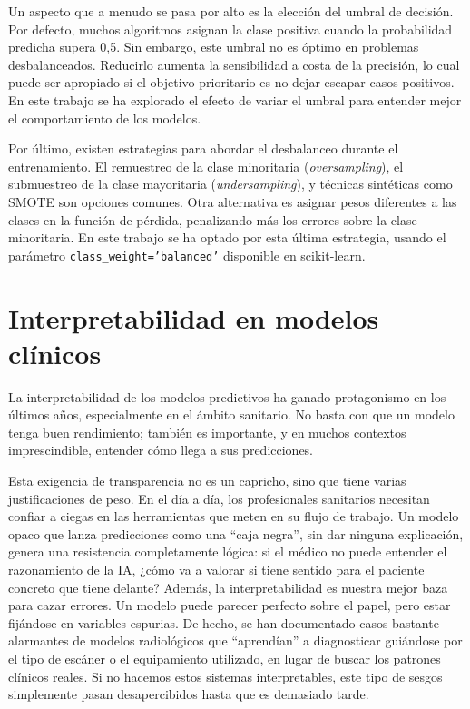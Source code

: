 \documentclass[12pt, a4paper, oneside]{report}
\begin{document}
Un aspecto que a menudo se pasa por alto es la elección del umbral de decisión. Por defecto, muchos algoritmos asignan la clase positiva cuando la probabilidad predicha supera 0,5. Sin embargo, este umbral no es óptimo en problemas desbalanceados. Reducirlo aumenta la sensibilidad a costa de la precisión, lo cual puede ser apropiado si el objetivo prioritario es no dejar escapar casos positivos. En este trabajo se ha explorado el efecto de variar el umbral para entender mejor el comportamiento de los modelos.

Por último, existen estrategias para abordar el desbalanceo durante el entrenamiento. El remuestreo de la clase minoritaria (\textit{oversampling}), el submuestreo de la clase mayoritaria (\textit{undersampling}), y técnicas sintéticas como SMOTE son opciones comunes. Otra alternativa es asignar pesos diferentes a las clases en la función de pérdida, penalizando más los errores sobre la clase minoritaria. En este trabajo se ha optado por esta última estrategia, usando el parámetro \texttt{class\_weight='balanced'} disponible en scikit-learn.

\section{Interpretabilidad en modelos clínicos}

La interpretabilidad de los modelos predictivos ha ganado protagonismo en los últimos años, especialmente en el ámbito sanitario. No basta con que un modelo tenga buen rendimiento; también es importante, y en muchos contextos imprescindible, entender cómo llega a sus predicciones.

Esta exigencia de transparencia no es un capricho, sino que tiene varias justificaciones de peso. En el día a día, los profesionales sanitarios necesitan confiar a ciegas en las herramientas que meten en su flujo de trabajo. Un modelo opaco que lanza predicciones como una ``caja negra'', sin dar ninguna explicación, genera una resistencia completamente lógica: si el médico no puede entender el razonamiento de la IA, ¿cómo va a valorar si tiene sentido para el paciente concreto que tiene delante? Además, la interpretabilidad es nuestra mejor baza para cazar errores. Un modelo puede parecer perfecto sobre el papel, pero estar fijándose en variables espurias. De hecho, se han documentado casos bastante alarmantes de modelos radiológicos que ``aprendían'' a diagnosticar guiándose por el tipo de escáner o el equipamiento utilizado, en lugar de buscar los patrones clínicos reales. Si no hacemos estos sistemas interpretables, este tipo de sesgos simplemente pasan desapercibidos hasta que es demasiado tarde.
\end{document}

